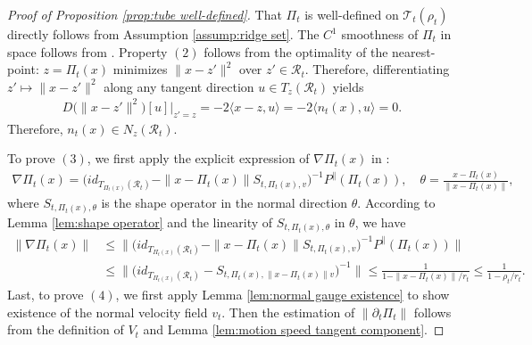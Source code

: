 \documentclass[11pt]{article}
\newcommand{\mc}{\mathcal}
\begin{document}
\begin{proof}[Proof of Proposition \ref{prop:tube well-defined}] That $\Pi_t$ is well-defined on $\mc{T}_t(\rho_t)$ directly follows from Assumption \ref{assump:ridge set}. The $C^1$ smoothness of $\Pi_t$ in space follows from \cite[Theorem 2]{leobacher2021existence}. Property $(2)$ follows from the optimality of the nearest-point: $z=\Pi_t(x)$ minimizes $\|x-z'\|^2$ over $z'\in \mc{R}_t$. Therefore, differentiating $z'\mapsto \|x-z'\|^2$ along any tangent direction $u\in T_z(\mc{R}_t)$ yields
\begin{align*}
    D\big( \|x-z'\|^2 \big)[u]|_{z'=z} = -2\langle x-z, u \rangle =-2\langle n_t(x), u \rangle= 0 .
\end{align*}
Therefore, $n_t(x)\in N_z(\mc{R}_t)$.   

\noindent To prove $(3)$, we first apply the explicit expression of $\nabla\Pi_t(x)$ in \cite[Theorem C]{leobacher2021existence}:
\begin{align*}
    \nabla \Pi_t(x) = \big( id_{T_{\Pi_t(x)}(\mc{R}_t)} - \| x- \Pi_t(x) \| S_{t,\Pi_t(x), v} \big)^{-1} P^\parallel(\Pi_t(x)),\quad \theta = \frac{x-\Pi_t(x)}{\|x-\Pi_t(x)\|},
\end{align*}
where $S_{t,\Pi_t(x), \theta}$ is the shape operator in the normal direction $\theta$. According to Lemma \ref{lem:shape operator} and the linearity of $S_{t,\Pi_t(x),\theta}$ in $\theta$, we have 
\begin{align*}
    \|\nabla \Pi_t(x)\| & \le \| \big( id_{T_{\Pi_t(x)}(\mc{R}_t)} - \| x- \Pi_t(x) \| S_{t,\Pi_t(x), v} \big)^{-1} P^\parallel(\Pi_t(x))\| \\
    &\le  \| \big( id_{T_{\Pi_t(x)}(\mc{R}_t)} - S_{t,\Pi_t(x), \| x- \Pi_t(x) \| v} \big)^{-1} \| \le  \frac{1}{1- \| x-\Pi_t(x) \|/r_t } \le  \frac{1}{1- \rho_t/r_t }.
\end{align*}
\noindent Last, to prove $(4)$, we first apply Lemma \ref{lem:normal gauge existence} to show existence of the normal velocity field $v_t$. Then the estimation of $\|\partial_t\Pi_t\|$ follows from the definition of $V_t$ and Lemma \ref{lem:motion speed tangent component}.
\end{proof}
\end{document}
